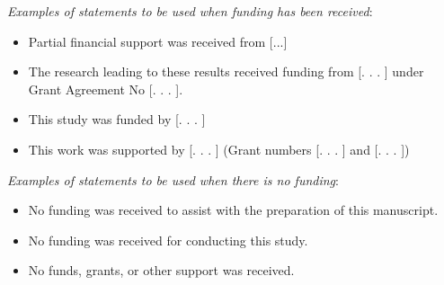 \documentclass[12pt]{sn-jnl}%
\theoremstyle{thmstyleone}%
\theoremstyle{thmstyletwo}%
\theoremstyle{thmstylethree}%
\begin{document}
\textit{Examples of statements to be used when funding has been received}:
\begin{itemize}
\item 
Partial financial support was received from [...]
\item 
The research leading to these results received funding from [. . . ] under Grant Agreement No [. . . ].
\item 
This study was funded by [. . . ]
\item 
This work was supported by [. . . ] (Grant numbers [. . . ] and [. . . ])
\end{itemize}
\noindent \textit{Examples of statements to be used when there is no funding}:
\begin{itemize}
\item 
No funding was received to assist with the preparation of this manuscript.
\item 
No funding was received for conducting this study.
\item 
No funds, grants, or other support was received.
\end{itemize}
\end{document}
